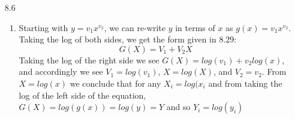 \documentclass[11pt,a4paper]{article}
\begin{document}
\begin{itemize}
\begin{enumerate} [label={\alph*)}]
					
					\item Solving using the relative least squares function we find $V_1$ and $V_2$ using the partial derivatives again:
					\begin{align*}
						E(V_1,V_2) &= \sum\limits_{i=1}^n \Big[\frac{V_1 + V_2cos\theta - R_i}{R_i}\Big]^2 \\
						\frac{\partial E}{\partial V_1} &= \sum\limits_{i=1}^n 2\Big[\frac{V_1 + V_2cos\theta - R_i}{R_i}\Big]\Big[\frac{1}{R_i}\Big] = 0\\
						\frac{\partial E}{\partial V_2} &= \sum\limits_{i=1}^n 2\Big[\frac{V_1 + V_2cos\theta - R_i}{R_i}\Big]\Big[\frac{cos\theta}{R_i}\Big] = 0
					\end{align*}
					This changes our matrix $A$ to be $\begin{pmatrix} \Sigma \frac{1}{R^2} & \Sigma \frac{cos\theta}{R^2} \\ \Sigma \frac{cos\theta}{R^2} & \Sigma \frac{cos^2\theta}{R^2} \end{pmatrix}$ where we see a common $R^2$ under each term. This then changes our calculation of $V_1$ and $V_2$ and we get:
					$$\begin{pmatrix} V_1 \\ V_2 \end{pmatrix} = \begin{pmatrix} .0026229460 \\ .1891379693 \end{pmatrix}$$
					Using these to solve for $p$ and $\varepsilon$ we see $p = \frac{1}{V_1} = 1.2429$ and $\varepsilon = V_2*p \approx .9232$
					This turns out to approximate the actual data points better than the original function and so if we had to choose, we should use this version.
				\end{enumerate}
			\item[8.6]
				\begin{enumerate} [label={\alph*)}]
					\item Starting with $y=v_1x^{v_2}$, we can re-write $y$ in terms of $x$ as $g(x)=v_1x^{v_2}$. Taking the log of both sides, we get the form given in $8.29$:
					$$G(X) = V_1 + V_2X$$
					Taking the log of the right side we see $G(X) = log(v_1) + v_2log(x)$, and accordingly we see $V_1=log(v_1)$, $X = log(X)$, and $V_2 = v_2$. From $X = log(x)$ we conclude that for any $X_i = log(x_i$ and from taking the log of the left side of the equation, $G(X) = log(g(x)) = log(y) = Y$ and so $Y_i = log(y_i)$
					

\end{enumerate}
\end{itemize}
\end{document}
